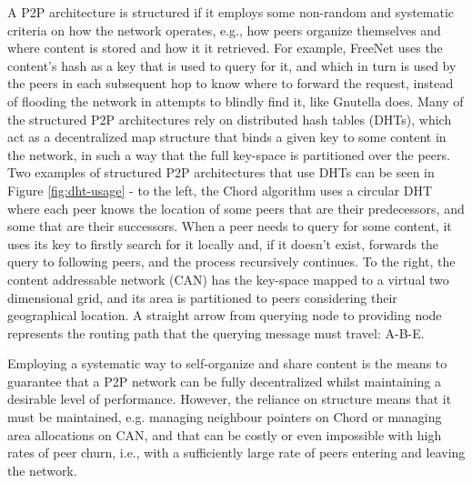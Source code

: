     A P2P architecture is structured if it employs some non-random and systematic criteria on how the network operates, e.g., how peers organize themselves and where content is stored and how it it retrieved.
    For example, FreeNet uses the content's hash as a key that is used to query for it, and which in turn is used by the peers in each subsequent hop to know where to forward the request, instead of flooding the network in attempts to blindly find it, like Gnutella does.
    Many of the structured P2P architectures rely on distributed hash tables (DHTs), which act as a decentralized map structure that binds a given key to some content in the network, in such a way that the full key-space is partitioned over the peers.
    Two examples of structured P2P architectures that use DHTs can be seen in Figure \ref{fig:dht-usage} - to the left, the Chord algorithm uses a circular DHT where each peer knows the location of some peers that are their predecessors, and some that are their successors.
    When a peer needs to query for some content, it uses its key to firstly search for it locally and, if it doesn't exist, forwards the query to following peers, and the process recursively continues.
    To the right, the content addressable network (CAN) has the key-space mapped to a virtual two dimensional grid, and its area is partitioned to peers considering their geographical location.
    A straight arrow from querying node to providing node represents the routing path that the querying message must travel: A-B-E.

    Employing a systematic way to self-organize and share content is the means to guarantee that a P2P network can be fully decentralized whilst maintaining a desirable level of performance.
    However, the reliance on structure means that it must be maintained, e.g. managing neighbour pointers on Chord or managing area allocations on CAN, and that can be costly or even impossible with high rates of peer churn, i.e., with a sufficiently large rate of peers entering and leaving the network.

